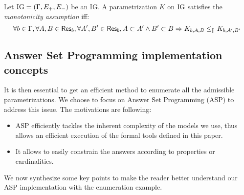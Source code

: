 \begin{property}
\label{prop:param_enum_monotonicity}
Let $\mathrm{IG} = (\Gamma, E_+, E_-)$ be an IG. A parametrization $K$ on $\mathrm{IG}$ satisfies the \emph{monotonicity assumption} iff:
\[
  \forall b \in \Gamma, \forall A,B \in \mathsf{Res}_{b}, \forall A',B' \in \mathsf{Res}_{b},
  A \subset A' \wedge B' \subset B \Rightarrow K_{b,A,B} \leq_{[]} K_{b,A',B'}
\]
\end{property}

\begin{comment}
\begin{definition}[Admissible parametrization \& Admissible parametrization with respect to inferred parameters]
\label{def:param_enum_inf}
Let $\PH = (\PHs, \PHl, \PHh)$ be a PH so that IG inference is possible, and $\IG = (\Gamma, E_+,
E_-)$ the inferred IG.
A parametrization $K$ on $\IG$ is said to be \emph{admissible} iff it respects
the extreme values assumption, the activity assumption and the monotonicity assumption.
A parametrization $K$ on $\IG$ is said to be \emph{admissible with respect to the
inferred parameters} iff it is admissible and that all parameters that can be inferred regarding
\pref{pps:param_K} are equal to their inferred value.
\end{definition}

\todo{utilité de “Admissible parametrization” seul ?}
\end{comment}


\subsection{Answer Set Programming implementation concepts}

\newcommand{\ti}[1]{\texttt{\textit{#1}}}
\newcommand{\aspil}[1]{\texttt{#1}}
\newcommand{\asp}[1]{\begin{itemize} \item[] \aspil{#1} \end{itemize}}

It is then essential to get an efficient method to enumerate all the admissible parametrizations. We choose to focus on Answer Set Programming (ASP) \cite{Baral03} to address this issue. The motivations are following: 
\begin{itemize}
\item ASP efficiently tackles the inherent complexity of the models we use, thus allows an efficient execution of the formal tools defined in this paper.
\item It allows to easily constrain the answers according to properties or cardinalities.
\end{itemize}
We now synthesize some key points to make the reader better understand our ASP implementation with the enumeration example.

